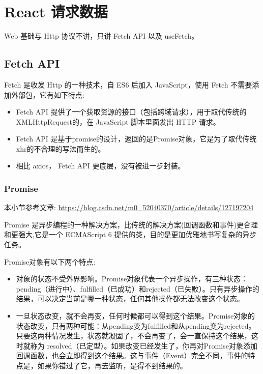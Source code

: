 \section{React 请求数据}

Web 基础与 Http 协议不讲，只讲 Fetch API 以及 useFetch。

\subsection{Fetch API}

Fetch 是收发 Http 的一种技术，自 ES6 后加入 JavaScript，使用 Fetch 不需要添加外部包，它有如下特点:

\begin{itemize}
    \item Fetch API 提供了一个获取资源的接口（包括跨域请求），用于取代传统的XMLHttpRequest的，在 JavaScript 脚本里面发出 HTTP 请求。
    \item Fetch API 是基于promise的设计，返回的是Promise对象，它是为了取代传统xhr的不合理的写法而生的。
    \item 相比 axios， Fetch API 更底层，没有被进一步封装。
\end{itemize}

\subsubsection{Promise}

本小节参考文章: \url{https://blog.csdn.net/m0_52040370/article/details/127197204}

Promise 是异步编程的一种解决方案，比传统的解决方案(回调函数和事件)更合理和更强大,它是一个 ECMAScript 6 提供的类，目的是更加优雅地书写复杂的异步任务。

Promise对象有以下两个特点:
\begin{itemize}
    \item 对象的状态不受外界影响。Promise对象代表一个异步操作，有三种状态：pending（进行中）、fulfilled（已成功）和rejected（已失败）。只有异步操作的结果，可以决定当前是哪一种状态，任何其他操作都无法改变这个状态。
    \item 一旦状态改变，就不会再变，任何时候都可以得到这个结果。Promise对象的状态改变，只有两种可能：从pending变为fulfilled和从pending变为rejected。只要这两种情况发生，状态就凝固了，不会再变了，会一直保持这个结果，这时就称为 resolved（已定型）。如果改变已经发生了，你再对Promise对象添加回调函数，也会立即得到这个结果。这与事件（Event）完全不同，事件的特点是，如果你错过了它，再去监听，是得不到结果的。
\end{itemize}

